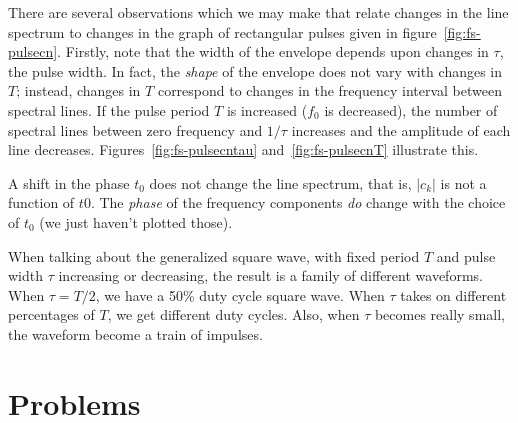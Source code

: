 There are several observations which we may make that relate
changes in the line spectrum to changes in the graph of rectangular pulses
given in figure~\ref{fig:fs-pulsecn}. Firstly, note that the width of the envelope
depends upon changes in $\tau$, the pulse width. In fact,
the \emph{shape} of the envelope does not vary with changes in $T$;
instead, changes in $T$ correspond to changes in the frequency
interval between spectral lines. If the pulse period $T$ is increased
($f_0$ is decreased), the number of spectral lines between zero
frequency and $1/\tau$ increases and the amplitude of each line
decreases. Figures~\ref{fig:fs-pulsecntau} and~\ref{fig:fs-pulsecnT}
illustrate this.

A shift in the phase $t_0$ does not change the line spectrum,
that is, $|c_k|$ is not a function of $t0$. The \emph{phase} of the
frequency components \emph{do} change with the choice of $t_0$ (we just
haven't plotted those).

When talking about the generalized square wave, with fixed period $T$
and pulse width $\tau$ increasing or decreasing, the result is a
family of different waveforms. When $\tau = T/2$, we have a 50\% duty
cycle square wave. When $\tau$ takes on different percentages of $T$,
we get different duty cycles. Also, when $\tau$ becomes really small,
the waveform become a train of impulses.




\section{Problems}

